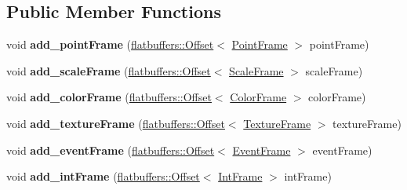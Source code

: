 \subsection*{Public Member Functions}
\begin{DoxyCompactItemize}
\item 
\mbox{\label{structflatbuffers_1_1FrameBuilder_a35c3aba0c332570d1799e397ddbb878a}} 
void {\bfseries add\+\_\+point\+Frame} (\hyperlink{structflatbuffers_1_1Offset}{flatbuffers\+::\+Offset}$<$ \hyperlink{structflatbuffers_1_1PointFrame}{Point\+Frame} $>$ point\+Frame)
\item 
\mbox{\label{structflatbuffers_1_1FrameBuilder_ac62911862ae54604654259b250f62d61}} 
void {\bfseries add\+\_\+scale\+Frame} (\hyperlink{structflatbuffers_1_1Offset}{flatbuffers\+::\+Offset}$<$ \hyperlink{structflatbuffers_1_1ScaleFrame}{Scale\+Frame} $>$ scale\+Frame)
\item 
\mbox{\label{structflatbuffers_1_1FrameBuilder_a201a2fce6152ac142266550904845393}} 
void {\bfseries add\+\_\+color\+Frame} (\hyperlink{structflatbuffers_1_1Offset}{flatbuffers\+::\+Offset}$<$ \hyperlink{structflatbuffers_1_1ColorFrame}{Color\+Frame} $>$ color\+Frame)
\item 
\mbox{\label{structflatbuffers_1_1FrameBuilder_aaef0b8db77626281801f505ec566a8c8}} 
void {\bfseries add\+\_\+texture\+Frame} (\hyperlink{structflatbuffers_1_1Offset}{flatbuffers\+::\+Offset}$<$ \hyperlink{structflatbuffers_1_1TextureFrame}{Texture\+Frame} $>$ texture\+Frame)
\item 
\mbox{\label{structflatbuffers_1_1FrameBuilder_ad7686a0aed58aed9958aa7a26ca192e8}} 
void {\bfseries add\+\_\+event\+Frame} (\hyperlink{structflatbuffers_1_1Offset}{flatbuffers\+::\+Offset}$<$ \hyperlink{structflatbuffers_1_1EventFrame}{Event\+Frame} $>$ event\+Frame)
\item 
\mbox{\label{structflatbuffers_1_1FrameBuilder_ab2f82663283ddeafc40b2dd41c71b15a}} 
void {\bfseries add\+\_\+int\+Frame} (\hyperlink{structflatbuffers_1_1Offset}{flatbuffers\+::\+Offset}$<$ \hyperlink{structflatbuffers_1_1IntFrame}{Int\+Frame} $>$ int\+Frame)

\end{DoxyCompactItemize}
